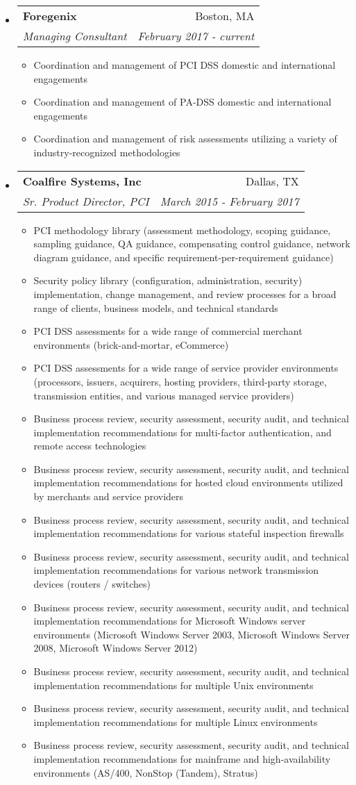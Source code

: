\documentclass[letterpaper,11pt]{article}
\makeatletter
\newcommand{\resitem}[1]{\item #1 \vspace{-2pt}}
\newcommand{\ressubheading}[4]{
\begin{tabular*}{6.5in}{l@{\cftdotfill{\cftsecdotsep}\extracolsep{\fill}}r}
		\textbf{#1} & #2 \\
		\textit{#3} & \textit{#4} \\
\end{tabular*}\vspace{-6pt}}
\makeatother
\begin{document}
\begin{itemize}

\item
	\ressubheading{Foregenix}{Boston, MA}{Managing Consultant}{February 2017 - current}
	\begin{itemize}
      \resitem{Coordination and management of PCI DSS domestic and international engagements}
      \resitem{Coordination and management of PA-DSS domestic and international engagements}
      \resitem{Coordination and management of risk assessments utilizing a variety of industry-recognized methodologies}
	\end{itemize}

\item
	\ressubheading{Coalfire Systems, Inc}{Dallas, TX}{Sr. Product Director, PCI}{March 2015 - February 2017}
	\begin{itemize}
            \resitem{PCI methodology library (assessment methodology, scoping guidance, sampling guidance, QA guidance, compensating control guidance, network diagram guidance, and specific requirement-per-requirement guidance)}
            \resitem{Security policy library (configuration, administration, security) implementation, change management, and review processes for a broad range of clients, business models, and technical standards}
            \resitem{PCI DSS assessments for a wide range of commercial merchant environments (brick-and-mortar, eCommerce)}
            \resitem{PCI DSS assessments for a wide range of service provider environments (processors, issuers, acquirers, hosting providers, third-party storage, transmission entities, and various managed service providers)}
            \resitem{Business process review, security assessment, security audit, and technical implementation recommendations for multi-factor authentication, and remote access technologies}
            \resitem{Business process review, security assessment, security audit, and technical implementation recommendations for hosted cloud environments utilized by merchants and service providers}
            \resitem{Business process review, security assessment, security audit, and technical implementation recommendations for various stateful inspection firewalls}
            \resitem{Business process review, security assessment, security audit, and technical implementation recommendations for various network transmission devices (routers / switches)}
            \resitem{Business process review, security assessment, security audit, and technical implementation recommendations for Microsoft Windows server environments (Microsoft Windows Server 2003, Microsoft Windows Server 2008, Microsoft Windows Server 2012)}
            \resitem{Business process review, security assessment, security audit, and technical implementation recommendations for multiple Unix environments}
            \resitem{Business process review, security assessment, security audit, and technical implementation recommendations for multiple Linux environments}
            \resitem{Business process review, security assessment, security audit, and technical implementation recommendations for mainframe and high-availability environments (AS/400, NonStop (Tandem), Stratus)}
	\end{itemize}


\end{itemize}
\end{document}

